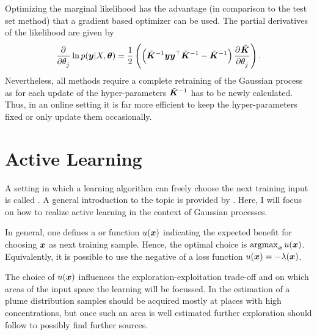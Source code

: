 Optimizing the marginal likelihood has the advantage (in comparison to the test 
set method) that a gradient based optimizer can be used. The partial derivatives 
of the likelihood are given by
\begin{equation}
    \dpd{}{\theta_j} \ln p(\vc y | X, \vc\theta) = \frac{1}{2} 
    \del{\del{\tilde{\mat K}^{-1}\vc y \vc y\Tr \tilde{\mat K}^{-1} 
            - \tilde{\mat{K}}^{-1}} \dpd{\tilde{\mat K}}{\theta_j}} \text{.}
\end{equation}
Nevertheless, all methods require a complete retraining of the Gaussian process 
as for each update of the hyper-parameters $\tilde{\bm{K}}^{-1}$ has to be newly 
calculated.  Thus, in an online setting it is far more efficient to keep the 
hyper-parameters fixed or only update them occasionally.

\section{Active Learning}\label{sec:utility}
A setting in which a learning algorithm can freely choose the next training 
input is called . A general introduction to the topic 
is provided by \textcite{Settles:2009vo}. Here, I will focus on how to realize 
active learning in the context of Gaussian processes.

In general, one defines a  or  function 
$u(\bm{x})$ indicating the expected benefit for choosing $\bm{x}$ as next training 
sample. Hence, the optimal choice is $\operatorname*{argmax}_{\bm{x}} u(\bm{x})$. Equivalently, 
it is possible to use the negative of a loss function $u(\bm{x}) = - \lambda(\bm{x})$.

The choice of $u(\bm{x})$ influences the exploration-exploitation trade-off and 
on which areas of the input space the learning will be focussed. In the 
estimation of a plume distribution samples should be acquired mostly at places 
with high concentrations, but once such an area is well estimated further 
exploration should follow to possibly find further sources.

